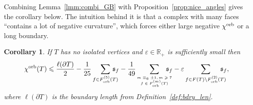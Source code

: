 \documentclass{amsart}
\newtheorem{corollary}[conjecture]{Corollary}
\newcommand{\cho}{\chi^{\textnormal{orb}}}
\newcommand{\Forb}[1][m]{F^{(#1)}_{\textnormal{orb}}}
\begin{document}
Combining Lemma~\ref{lmm:combi_GB} with Proposition~\ref{prop:nice_angles} gives the corollary below. The intuition behind it is that a complex with many faces ``contains a lot of negative curvature'', which forces either large negative $\cho$ or a long boundary.
\begin{corollary}\label{cor:cho_bd}
If $T$ has no isolated vertices and $\varepsilon\in\mathbb{R}_+$ is sufficiently small then
\begin{equation*}
\cho(T)\leqslant\frac{\ell(\partial T)}{2}-\frac{1}{25}\sum_{f\in\Forb[5](T)}\hspace*{-10pt}\mathfrak{s}_f-\frac{1}{49}\sum_{\tiny\begin{matrix}m\equiv_6\pm1,m\geqslant7\\f\in\Forb(T)\end{matrix}}\hspace*{-10pt}\mathfrak{s}_f-\varepsilon\sum_{f\in F(T)\setminus\Forb[2](T)}\hspace*{-10pt}\mathfrak{s}_f,
\end{equation*}
where $\ell(\partial T)$ is the boundary length from Definition~\ref{def:bdry_len}.
\end{corollary}
\end{document}
